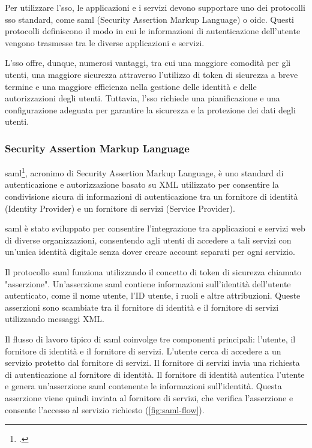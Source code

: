 Per utilizzare l'\acrshort{sso}, le applicazioni e i servizi devono supportare uno dei protocolli \acrshort{sso} standard, come \acrshort{saml} (Security Assertion Markup Language) o \acrshort{oidc}. Questi protocolli definiscono il modo in cui le informazioni di autenticazione dell'utente vengono trasmesse tra le diverse applicazioni e servizi.

L'\acrshort{sso} offre, dunque, numerosi vantaggi, tra cui una maggiore comodità per gli utenti, una maggiore sicurezza attraverso l'utilizzo di token di sicurezza a breve termine e una maggiore efficienza nella gestione delle identità e delle autorizzazioni degli utenti. Tuttavia, l'\acrshort{sso} richiede una pianificazione e una configurazione adeguata per garantire la sicurezza e la protezione dei dati degli utenti.

\subsubsection{Security Assertion Markup Language}

\acrshort{saml}\footcite{site:saml}, acronimo di Security Assertion Markup Language, è uno standard di autenticazione e autorizzazione basato su XML utilizzato per consentire la condivisione sicura di informazioni di autenticazione tra un fornitore di identità (Identity Provider) e un fornitore di servizi (Service Provider).

\acrshort{saml} è stato sviluppato per consentire l'integrazione tra applicazioni e servizi web di diverse organizzazioni, consentendo agli utenti di accedere a tali servizi con un'unica identità digitale senza dover creare account separati per ogni servizio.

Il protocollo \acrshort{saml} funziona utilizzando il concetto di token di sicurezza chiamato "asserzione". Un'asserzione \acrshort{saml} contiene informazioni sull'identità dell'utente autenticato, come il nome utente, l'ID utente, i ruoli e altre attribuzioni. Queste asserzioni sono scambiate tra il fornitore di identità e il fornitore di servizi utilizzando messaggi XML.

Il flusso di lavoro tipico di \acrshort{saml} coinvolge tre componenti principali: l'utente, il fornitore di identità e il fornitore di servizi. L'utente cerca di accedere a un servizio protetto dal fornitore di servizi. Il fornitore di servizi invia una richiesta di autenticazione al fornitore di identità. Il fornitore di identità autentica l'utente e genera un'asserzione \acrshort{saml} contenente le informazioni sull'identità. Questa asserzione viene quindi inviata al fornitore di servizi, che verifica l'asserzione e consente l'accesso al servizio richiesto (\autoref{fig:saml-flow}).

